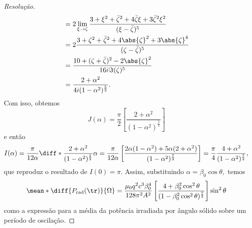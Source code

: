 \begin{proof}[Resolução]
\begin{align*}
                                      &= 2\lim_{\xi \to \zeta}{} \frac{3 + \xi^2 + \bar{\zeta}^2 + 4 \bar{\zeta} \xi + 3 \bar{\zeta}^2 \xi^2 }{(\xi - \bar{\zeta})^5}\\
                                      &= 2 \frac{3 + \zeta^2 + \bar{\zeta}^2 + 4 \abs{\zeta}^2 + 3 \abs{\zeta}^4}{(\zeta - \bar{\zeta})^5}\\
                                      &= \frac{10 + (\zeta + \bar{\zeta})^2 - 2 \abs{\zeta}^2}{16 i \Im(\zeta)^5}\\
                                      &= \frac{2 + \alpha^2}{4 i (1 - \alpha^2)^{\frac52}}.
    \end{align*}
    Com isso, obtemos
    \begin{equation*}
        J(\alpha) = \frac{\pi}{2} \left[\frac{2 + \alpha^2}{(1 - \alpha^2)^{\frac52}}\right]
    \end{equation*}
    e então
    \begin{equation*}
        I(\alpha) = \frac{\pi}{12 \alpha} \diff*{\frac{2 + \alpha^2}{(1 - \alpha^2)^{\frac52}}}{\alpha} = \frac{\pi}{12 \alpha} \left[\frac{2 \alpha (1 - \alpha^2) + 5\alpha(2 + \alpha^2)}{(1 - \alpha^2)^{\frac72}}\right] = \frac{\pi}{4} \frac{4 + \alpha^2}{(1 - \alpha^2)^{\frac72}},
    \end{equation*}
    que reproduz o resultado de \(I(0) = \pi.\) Assim, substituindo \(\alpha = \beta_0 \cos\theta,\) temos
    \begin{equation*}
        \mean*{\diff{P_\mathrm{rad}(\tr)}{\Omega}} = \frac{\mu_0 q^2 c^3 \beta_0^4}{128 \pi^2 A^2} \left[\frac{4 + \beta_0^2 \cos^2\theta}{(1 - \beta_0^2 \cos^2 \theta)^{\frac72}}\right] \sin^2\theta
    \end{equation*}
    como a expressão para a média da potência irradiada por ângulo sólido sobre um período de oscilação.
\end{proof}
